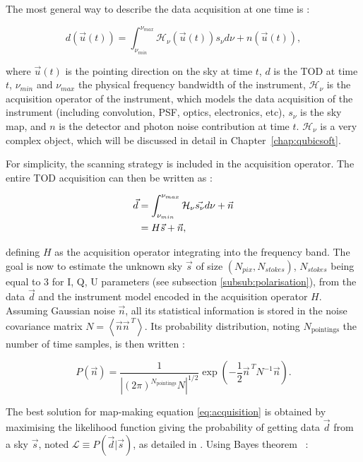 \documentclass[../../thesis.tex]{subfiles}
\begin{document}
The most general way to describe the data acquisition at one time is : 

\begin{equation}
    d(\vec{u}(t)) = \int_{\nu_{min}}^{\nu_{max}} \mathcal{H}_\nu(\vec{u}(t)) s_\nu d\nu + n(\vec{u}(t)),
\end{equation}

where $\vec{u}(t)$ is the pointing direction on the sky at time $t$, $d$ is the TOD at time $t$, $\nu_{min}$ and $\nu_{max}$ the physical frequency bandwidth of the instrument, $\mathcal{H}_\nu$ is the acquisition operator of the instrument, which models the data acquisition of the instrument (including convolution, PSF, optics, electronics, etc), $s_\nu$ is the sky map, and $n$ is the detector and photon noise contribution at time $t$. $\mathcal{H}_\nu$ is a very complex object, which will be discussed in detail in Chapter~\ref{chap:qubicsoft}. 

For simplicity, the scanning strategy is included in the acquisition operator. The entire TOD acquisition can then be written as : 

\begin{align} \label{eq:acquisition}
    \vec{d} 
    &= \int_{\nu_{min}}^{\nu_{max}} \mathcal{H}_\nu  \vec{s_\nu} d\nu + \vec{n} \notag \\
    &= H\vec{s} + \vec{n},
\end{align}

defining $H$ as the acquisition operator integrating into the frequency band. The goal is now to estimate the unknown sky $\vec{s}$ of size $\left(N_{pix}, N_{stokes}\right)$, $N_{stokes}$ being equal to 3 for I, Q, U parameters (see subsection \ref{subsub:polarisation}), from the data $\vec{d}$ and the instrument model encoded in the acquisition operator $H$.
Assuming Gaussian noise $\vec{n}$, all its statistical information is stored in the noise covariance matrix $N=\left\langle\vec{n}\vec{n}^{~T}\right\rangle$. Its probability distribution, noting $N_{\text{pointings}}$ the number of time samples, is then written :

\begin{equation}
    P(\vec{n}) = \frac{1}{\left|(2\pi)^{N_{\text{pointings}}}N\right|^{1/2}} \exp\left(-\frac{1}{2}\vec{n}^{~T} N^{-1}\vec{n}\right).
\end{equation}

The best solution for map-making equation \ref{eq:acquisition} is obtained by maximising the likelihood function giving the probability of getting data $\vec{d}$ from a sky $\vec{s}$, noted $\mathcal{L} \equiv P(\vec{d} | \vec{s})$, as detailed in \cite{wright1996}. Using Bayes theorem~\cite{bayes1763} :
\end{document}

